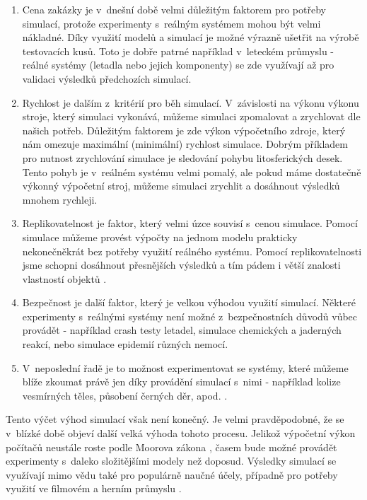 \begin{enumerate}
    \item Cena zakázky je v~dnešní době velmi důležitým faktorem pro potřeby simulací, protože experimenty s~reálným systémem mohou být velmi nákladné. Díky využití modelů a simulací je možné výrazně ušetřit na výrobě testovacích kusů. Toto je dobře patrné například v~leteckém průmyslu - reálné systémy (letadla nebo jejich komponenty) se zde využívají až pro validaci výsledků předchozích simulací.
    \item Rychlost je dalším z~kritérií pro běh simulací. V~závislosti na výkonu výkonu stroje, který simulaci vykonává, můžeme simulaci zpomalovat a zrychlovat dle našich potřeb. Důležitým faktorem je zde výkon výpočetního zdroje, který nám omezuje maximální (minimální) rychlost simulace. Dobrým příkladem pro nutnost zrychlování simulace je sledování pohybu litosferických desek. Tento pohyb je v~reálném systému velmi pomalý, ale pokud máme dostatečně výkonný výpočetní stroj, můžeme simulaci zrychlit a dosáhnout výsledků mnohem rychleji.
    \item Replikovatelnost je faktor, který velmi úzce souvisí s~cenou simulace. Pomocí simulace můžeme provést výpočty na jednom modelu prakticky nekonečněkrát bez potřeby využití reálného systému. Pomocí replikovatelnosti jsme schopni dosáhnout přesnějších výsledků a tím pádem i větší znalosti vlastností objektů \cite{belanger2010and}.
    \item Bezpečnost je další faktor, který je velkou výhodou využití simulací. Některé experimenty s~reálnými systémy není možné z~bezpečnostních důvodů vůbec provádět - například crash testy letadel, simulace chemických a jaderných reakcí, nebo simulace epidemií různých nemocí.
    \item V~neposlední řadě je to možnost experimentovat se systémy, které můžeme blíže zkoumat právě jen díky provádění simulací s~nimi - například kolize vesmírných těles, působení černých děr, apod. \cite{Fragile_2007}.
\end{enumerate}

Tento výčet výhod simulací však není konečný. Je velmi pravděpodobné, že se v~blízké době objeví další velká výhoda tohoto procesu. Jelikož výpočetní výkon počítačů neustále roste podle Moorova zákona \cite{Schaller1997}, časem bude možné provádět experimenty s~daleko složitějšími modely než doposud. Výsledky simulací se využívají mimo vědu také pro populárně naučné účely, případně pro potřeby využití ve filmovém a herním průmyslu \cite{James_2015}.

